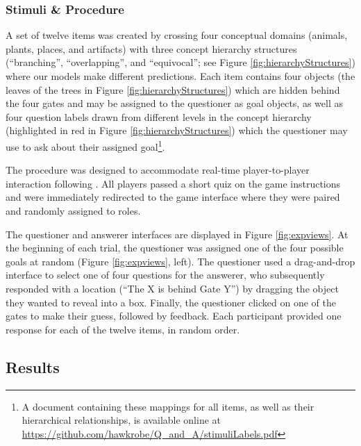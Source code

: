 \documentclass[12pt, floatsintext, jou]{apa6}
\begin{document}
\subsubsection{Stimuli \& Procedure} A set of twelve items was created by crossing four conceptual domains (animals, plants, places, and artifacts) with three concept hierarchy structures (``branching'', ``overlapping'', and ``equivocal''; see Figure \ref{fig:hierarchyStructures}) where our models make different predictions. Each item contains four objects (the leaves of the trees in Figure \ref{fig:hierarchyStructures}) which are hidden behind the four gates and may be assigned to the questioner as goal objects, as well as four question labels drawn from different levels in the concept hierarchy (highlighted in red in Figure \ref{fig:hierarchyStructures}) which the questioner may use to ask about their assigned goal\footnote{A document containing these mappings for all items, as well as their hierarchical relationships, is available online at \scriptsize\url{https://github.com/hawkrobe/Q\_and\_A/stimuliLabels.pdf}}.

The procedure was designed to accommodate real-time player-to-player interaction following . All players passed a short quiz on the game instructions and were immediately redirected to the game interface where they were paired and randomly assigned to roles. %

The questioner and answerer interfaces are displayed in Figure \ref{fig:expviews}. %
At the beginning of each trial, the questioner was assigned one of the four possible goals at random (Figure \ref{fig:expviews}, left). The questioner used a drag-and-drop interface to select one of four questions for the answerer, who subsequently responded with a location (``The X is behind Gate Y'') by dragging the object they wanted to reveal into a box. Finally, the questioner clicked on one of the gates to make their guess, followed by feedback. Each participant provided one response for each of the twelve items, in random order.

\subsection{Results}
\end{document}
